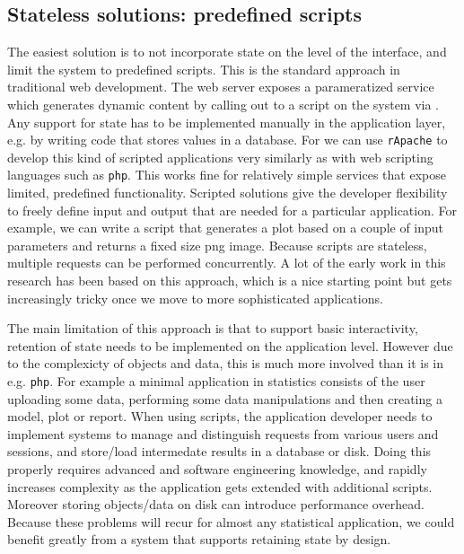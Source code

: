 \subsection{Stateless solutions: predefined scripts}

The easiest solution is to not incorporate state on the level of the interface, and limit the system to predefined scripts. This is the standard approach in traditional web development. The web server exposes a parameratized service which generates dynamic content by calling out to a script on the system via \CGI. Any support for state has to be implemented manually in the application layer, e.g. by writing code that stores values in a database. For \R we can use \texttt{rApache} \citep{horner2013rapache} to develop this kind of scripted applications very similarly as with web scripting languages such as \texttt{php}. This works fine for relatively simple services that expose limited, predefined functionality. Scripted solutions give the developer flexibility to freely define input and output that are needed for a particular application. For example, we can write a script that generates a plot based on a couple of input parameters and returns a fixed size png image. Because scripts are stateless, multiple requests can be performed concurrently. A lot of the early work in this research has been based on this approach, which is a nice starting point but gets increasingly tricky once we move to more sophisticated applications.

The main limitation of this approach is that to support basic interactivity, retention of state needs to be implemented on the application level. However due to the complexicty of objects and data, this is much more involved than it is in e.g. \texttt{php}. For example a minimal application in statistics consists of the user uploading some data, performing some data manipulations and then creating a model, plot or report. When using scripts, the application developer needs to implement systems to manage and distinguish requests from various users and sessions, and store/load intermedate results in a database or disk. Doing this properly requires advanced \R and software engineering knowledge, and rapidly increases complexity as the application gets extended with additional scripts. Moreover storing objects/data on disk can introduce performance overhead. Because these problems will recur for almost any statistical application, we could benefit greatly from a system that supports retaining state by design.

